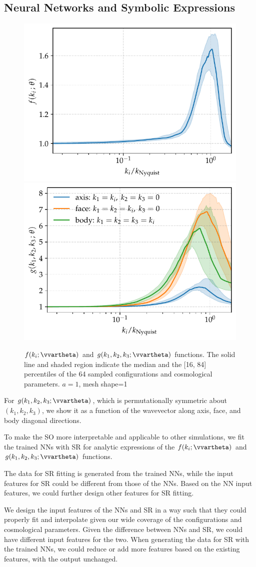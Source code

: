 \documentclass[modern, trackchanges, dvipsnames]{aastex631}
\begin{document}
\subsection{Neural Networks and Symbolic Expressions}

\begin{figure}
  \centering
  \includegraphics[width=.48\columnwidth]{net_f_a1_j3177874_e3000.pdf}
  \includegraphics[width=.48\columnwidth]{net_g_a1_j3177874_e3000.pdf}
  \caption{$f(k_i; \vvartheta)$ and $g(k_1, k_2, k_3; \vvartheta)$
  functions. The solid line and shaded region indicate the median and
  the [16, 84] percentiles of the 64 sampled configurations and
  cosmological parameters. $a=1$,
  mesh shape=1}
  \label{fig:func}
\end{figure}

For $g(k_1,k_2,k_3;\vvartheta)$, which is permutationally symmetric
about $(k_1, k_2, k_3)$, we show it as a function of the wavevector
along axis, face, and body diagonal directions.


To make the SO more interpretable and applicable to other simulations,
we fit the trained NNs with SR for analytic expressions of the $f(k_i;
\vvartheta)$ and $g(k_1, k_2, k_3; \vvartheta)$ functions.

The data for SR fitting is generated from the trained NNs, while the
input features for SR could be different from those of the NNs.
Based on the NN input features, we could further design other features
for SR fitting.

We design the input features of the NNs and SR in a way such that they
could properly fit and interpolate given our wide coverage of the
configurations and cosmological parameters.
Given the difference between NNs and SR, we could have different input
features for the two.
When generating the data for SR with the trained NNs, we could reduce or
add more features based on the existing features, with the output
unchanged.
\end{document}
